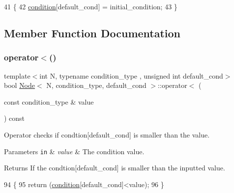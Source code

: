 \begin{DoxyCode}
41     \{
42         \hyperlink{struct_node_a84fa4c586396e81041eb3a4f6a46f418}{condition}[default\_cond] = initial\_condition;
43     \}
\end{DoxyCode}


\subsection{Member Function Documentation}
\mbox{\label{struct_node_a9a8c2549e36079adb11fa1aafe9c6cc0}} 
\subsubsection{\texorpdfstring{operator$<$()}{operator<()}}
{\footnotesize\ttfamily template$<$int N, typename condition\+\_\+type , unsigned int default\+\_\+cond$>$ \\
bool \hyperlink{struct_node}{Node}$<$ N, condition\+\_\+type, default\+\_\+cond $>$\+::operator$<$ (\begin{DoxyParamCaption}\item[{const condition\+\_\+type \&}]{value }\end{DoxyParamCaption}) const\hspace{0.3cm}{\ttfamily [inline]}}

Operator checks if {\ttfamily condtion}\mbox{[}{\ttfamily default\+\_\+cond}\mbox{]} is smaller than the value. 
\begin{DoxyParams}[1]{Parameters}
\mbox{\tt in}  & {\em value} & The condition value. \\
\hline
\end{DoxyParams}
\begin{DoxyReturn}{Returns}
If the {\ttfamily condtion}\mbox{[}{\ttfamily default\+\_\+cond}\mbox{]} is smaller than the inputted value. 
\end{DoxyReturn}

\begin{DoxyCode}
94     \{
95         \textcolor{keywordflow}{return} (\hyperlink{struct_node_a84fa4c586396e81041eb3a4f6a46f418}{condition}[default\_cond]<value);
96     \}
\end{DoxyCode}
\mbox{\label{struct_node_a1d153da28c06489540efb6cc7117eb6d}} 
